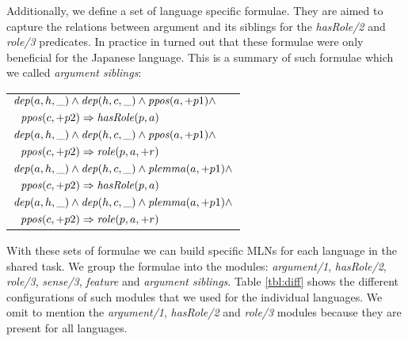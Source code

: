 Additionally, we define a set of language specific formulae. They are aimed to 
capture the relations between argument and its siblings for the \emph{hasRole/2} 
and \emph{role/3} predicates.  In practice in turned out that these formulae were only beneficial for 
the Japanese language.  This is a summary of such formulae which we called 
\emph{argument siblings}:
\begin{tabular}{p{7.5cm}}
   $ \mathit{dep}(a,h,\_) \land \mathit{dep}(h,c,\_) \land \mathit{ppos}(a,+p1) \land $\\$\ \ 
   \ppos(c,+p2) \Rightarrow \hasRole(p,a)    $\\
   $ \mathit{dep}(a,h,\_) \land \mathit{dep}(h,c,\_) \land \mathit{ppos}(a,+p1) \land $\\$\ \ 
   \ppos(c,+p2) \Rightarrow \role(p,a,+r)    $\\
   $ \mathit{dep}(a,h,\_) \land \mathit{dep}(h,c,\_) \land \mathit{plemma}(a,+p1) \land $\\$\ \ 
   \ppos(c,+p2) \Rightarrow \hasRole(p,a)    $\\
   $ \mathit{dep}(a,h,\_) \land \mathit{dep}(h,c,\_) \land \mathit{plemma}(a,+p1) \land $\\$\ \ 
   \ppos(c,+p2) \Rightarrow \role(p,a,+r)    $\\
\end{tabular}


With these sets of formulae we can build specific MLNs for each language in the 
shared task. We group the formulae into the modules: \emph{argument/1}, 
\emph{hasRole/2}, \emph{role/3}, \emph{sense/3}, \emph{feature} and 
\emph{argument siblings}.  Table \ref{tbl:diff} shows the different 
configurations of such modules that we used for the individual languages.  We 
omit to mention the \emph{argument/1}, \emph{hasRole/2} and \emph{role/3} 
modules because they are present for all languages. 


